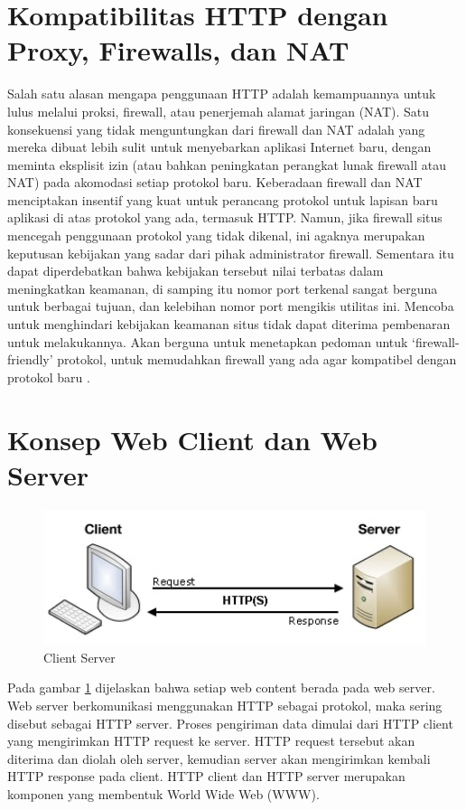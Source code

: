 \section{Kompatibilitas HTTP dengan Proxy, Firewalls, dan NAT}
Salah satu alasan mengapa penggunaan HTTP adalah kemampuannya untuk lulus melalui proksi, firewall, atau penerjemah alamat jaringan (NAT). Satu konsekuensi yang tidak menguntungkan dari firewall dan NAT adalah yang mereka dibuat lebih sulit untuk menyebarkan aplikasi Internet baru, dengan meminta eksplisit izin (atau bahkan peningkatan perangkat lunak firewall atau NAT) pada akomodasi setiap protokol baru. Keberadaan firewall dan NAT menciptakan insentif yang kuat untuk perancang protokol untuk lapisan baru aplikasi di atas protokol yang ada, termasuk HTTP. Namun, jika firewall situs mencegah penggunaan protokol yang tidak dikenal, ini agaknya merupakan keputusan kebijakan yang sadar dari pihak administrator firewall. Sementara itu dapat diperdebatkan bahwa kebijakan tersebut nilai terbatas dalam meningkatkan keamanan, di samping itu nomor port terkenal sangat berguna untuk berbagai tujuan, dan kelebihan nomor port mengikis utilitas ini. Mencoba untuk menghindari kebijakan keamanan situs tidak dapat diterima pembenaran untuk melakukannya. Akan berguna untuk menetapkan pedoman untuk `firewall-friendly' protokol, untuk memudahkan firewall yang ada agar kompatibel dengan protokol baru
\cite{moore2002use}.

\section{Konsep Web Client dan Web Server}

\begin{figure}[ht]
\centerline{\includegraphics[width=1\textwidth]{figures/2http.jpg}}
\caption{Client Server}
\label{2http}
\end{figure}

Pada gambar \ref{2http} dijelaskan bahwa setiap web content berada pada web server. Web server berkomunikasi menggunakan HTTP sebagai protokol, maka sering disebut sebagai HTTP server. Proses pengiriman data dimulai dari HTTP client yang mengirimkan HTTP request ke server. HTTP request tersebut akan diterima dan diolah oleh server, kemudian server akan mengirimkan kembali HTTP response pada client. HTTP client dan HTTP server merupakan komponen yang membentuk World Wide Web (WWW).

